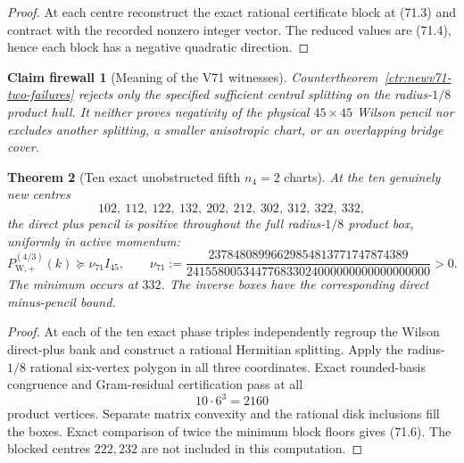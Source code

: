 \documentclass[11pt,oneside]{article}
\newtheorem{theorem}{Theorem}[section]
\newtheorem{firewall}[theorem]{Claim firewall}
\theoremstyle{definition}
\theoremstyle{remark}
\begin{document}
\begin{proof}
At each centre reconstruct the exact rational certificate block at
(71.3) and contract with the recorded nonzero integer vector.  The
reduced values are (71.4), hence each block has a negative quadratic
direction.
\end{proof}

\begin{firewall}[Meaning of the V71 witnesses]
\label{fire:newv71-witness-meaning}
Countertheorem~\ref{ctr:newv71-two-failures} rejects only the
specified sufficient central splitting on the radius-\(1/8\)
product hull.  It neither proves negativity of the physical
\(45\times45\) Wilson pencil nor excludes another splitting, a
smaller anisotropic chart, or an overlapping bridge cover.
\end{firewall}

\begin{theorem}[Ten exact unobstructed fifth \(n_4=2\) charts]
\label{thm:newv71-ten-charts}
At the ten genuinely new centres
\[
 102,\ 112,\ 122,\ 132,\ 202,\ 212,\ 302,\ 312,\ 322,\ 332, \tag{71.5}
\]
the direct plus pencil is positive throughout the full
radius-\(1/8\) product box, uniformly in active momentum:
\[
 P_{\mathrm W,+}^{(4/3)}(k)
 \succeq\nu_{71}I_{45},\qquad
 \nu_{71}:=
 \frac{23784808996629854813771747874389}
 {241558005344776833024000000000000000000}>0.         \tag{71.6}
\]
The minimum occurs at \(332\).  The inverse boxes have the
corresponding direct minus-pencil bound.
\end{theorem}

\begin{proof}
At each of the ten exact phase triples independently regroup the
Wilson direct-plus bank and construct a rational Hermitian
splitting.  Apply the radius-\(1/8\) rational six-vertex polygon in
all three coordinates.  Exact rounded-basis congruence and
Gram-residual certification pass at all
\[
 10\cdot6^3=2160                                      \tag{71.7}
\]
product vertices.  Separate matrix convexity and the rational disk
inclusions fill the boxes.  Exact comparison of twice the minimum
block floors gives (71.6).  The blocked centres \(222,232\) are not
included in this computation.
\end{proof}
\end{document}
